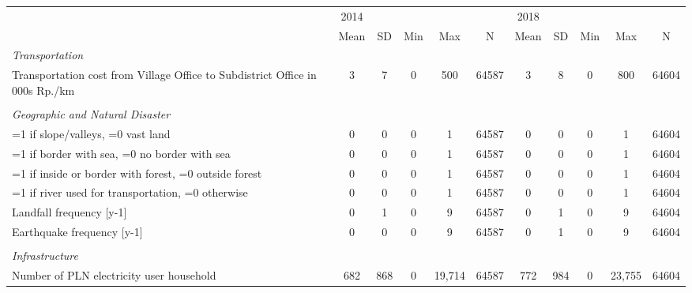 \begin{tabular}{l*{2}{ccccc}}
\toprule
                &     2014&         &         &         &         &     2018&         &         &         &         \\
                &     Mean&       SD&      Min&      Max&        N&     Mean&       SD&      Min&      Max&        N\\
\midrule
\emph{Transportation}&         &         &         &         &         &         &         &         &         &         \\
Transportation cost from Village Office to Subdistrict Office in 000s Rp./km&        3&        7&        0&      500&    64587&        3&        8&        0&      800&    64604\\
\vspace{0.1em} \\ \emph{Geographic and Natural Disaster}&         &         &         &         &         &         &         &         &         &         \\
=1 if slope/valleys, =0 vast land&        0&        0&        0&        1&    64587&        0&        0&        0&        1&    64604\\
=1 if border with sea, =0 no border with sea&        0&        0&        0&        1&    64587&        0&        0&        0&        1&    64604\\
=1 if inside or border with forest, =0 outside forest&        0&        0&        0&        1&    64587&        0&        0&        0&        1&    64604\\
=1 if river used for transportation, =0 otherwise&        0&        0&        0&        1&    64587&        0&        0&        0&        1&    64604\\
Landfall frequency [y-1]&        0&        1&        0&        9&    64587&        0&        1&        0&        9&    64604\\
Earthquake frequency [y-1]&        0&        0&        0&        9&    64587&        0&        1&        0&        9&    64604\\
\vspace{0.1em} \\ \emph{Infrastructure}&         &         &         &         &         &         &         &         &         &         \\
Number of PLN electricity user household&      682&      868&        0&   19,714&    64587&      772&      984&        0&   23,755&    64604\\

\end{tabular}
